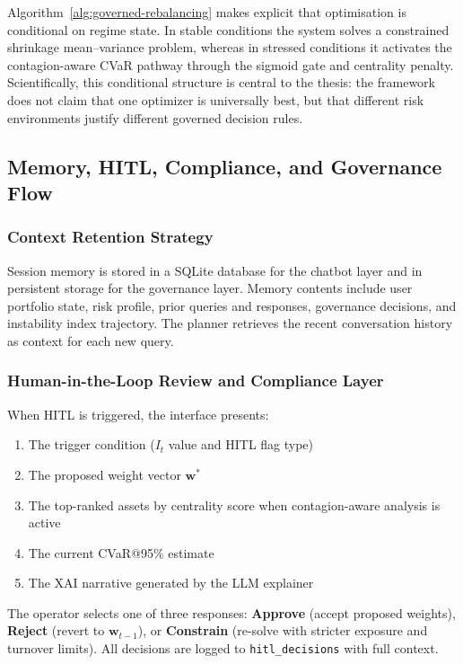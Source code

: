 \documentclass[11pt]{article}
\begin{document}
Algorithm~\ref{alg:governed-rebalancing} makes explicit that optimisation is conditional on regime state. In stable conditions the system solves a constrained shrinkage mean--variance problem, whereas in stressed conditions it activates the contagion-aware CVaR pathway through the sigmoid gate and centrality penalty. Scientifically, this conditional structure is central to the thesis: the framework does not claim that one optimizer is universally best, but that different risk environments justify different governed decision rules.

\subsection{Memory, HITL, Compliance, and Governance Flow}
\label{sec:hitl}

\subsubsection{Context Retention Strategy}

Session memory is stored in a SQLite database for the chatbot layer and in persistent storage for the governance layer. Memory contents include user portfolio state, risk profile, prior queries and responses, governance decisions, and instability index trajectory. The planner retrieves the recent conversation history as context for each new query.

\subsubsection{Human-in-the-Loop Review and Compliance Layer}

When HITL is triggered, the interface presents:
\begin{enumerate}
  \item The trigger condition ($I_t$ value and HITL flag type)
  \item The proposed weight vector $\mathbf{w}^*$
  \item The top-ranked assets by centrality score when contagion-aware analysis is active
  \item The current CVaR@95\% estimate
  \item The XAI narrative generated by the LLM explainer
\end{enumerate}

The operator selects one of three responses: \textbf{Approve} (accept proposed weights), \textbf{Reject} (revert to $\mathbf{w}_{t-1}$), or \textbf{Constrain} (re-solve with stricter exposure and turnover limits). All decisions are logged to \texttt{hitl\_decisions} with full context.
\end{document}
